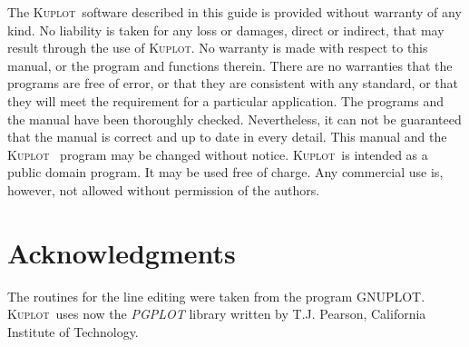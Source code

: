 \documentclass[11pt]{report}
\newcommand{\kuplot}{\textsc{Kuplot}}
\newcommand{\Kuplot}{\textsc{Kuplot\ }}
\begin{document}
The \Kuplot software described in this guide is provided
without warranty of any kind.  No liability is taken for any loss or
damages, direct or indirect, that may result through the use of \kuplot.  
No warranty is made with respect to this manual, or the
program and functions therein.  There are no warranties that the
programs are free of error, or that they are consistent with any
standard, or that they will meet the requirement for a particular
application.  The programs and the manual have been thoroughly
checked.  Nevertheless, it can not be guaranteed that the manual is
correct and up to date in every detail. This manual and the \Kuplot 
program may be changed without notice. \Kuplot is
intended as a public domain program. It may be used free of charge.
Any commercial use is, however, not allowed without permission of
the authors.

\section*{Acknowledgments}

The routines for the line editing were taken from the program
GNUPLOT. \Kuplot uses now the {\it PGPLOT} library written by
T.J. Pearson, California Institute of Technology.


\tableofcontents

%
%










\appendix

\end{document}
